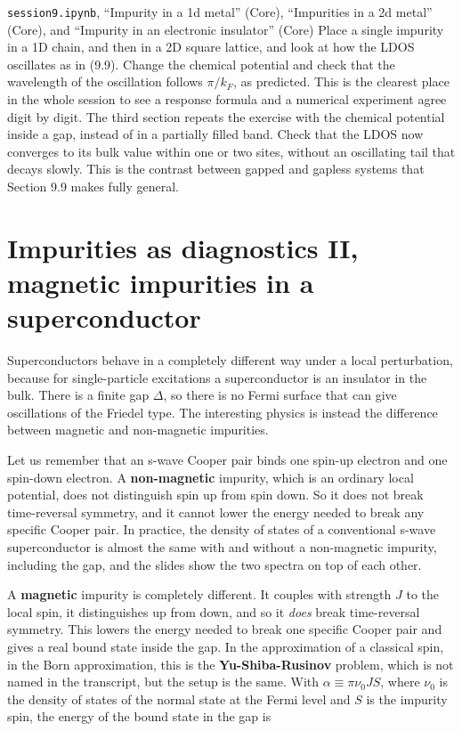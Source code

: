 \begin{notebookbox}{\texttt{session9.ipynb}, ``Impurity in a 1d metal'' (Core), ``Impurities in a 2d metal'' (Core), and ``Impurity in an electronic insulator'' (Core)}
Place a single impurity in a 1D chain, and then in a 2D square lattice, and look at how the LDOS
oscillates as in (9.9). Change the chemical potential and check that the wavelength of the
oscillation follows $\pi/k_F$, as predicted. This is the clearest place in the whole session to see a
response formula and a numerical experiment agree digit by digit. The third section repeats the
exercise with the chemical potential inside a gap, instead of in a partially filled band. Check that
the LDOS now converges to its bulk value within one or two sites, without an oscillating tail that
decays slowly. This is the contrast between gapped and gapless systems that Section 9.9 makes fully
general.
\end{notebookbox}

\section{Impurities as diagnostics II, magnetic impurities in a superconductor}

Superconductors behave in a completely different way under a local perturbation, because for
single-particle excitations a superconductor is an insulator in the bulk. There is a finite gap
$\Delta$, so there is no Fermi surface that can give oscillations of the Friedel type. The interesting
physics is instead the difference between magnetic and non-magnetic impurities.

Let us remember that an s-wave Cooper pair binds one spin-up electron and one spin-down electron. A
\textbf{non-magnetic} impurity, which is an ordinary local potential, does not distinguish spin up from
spin down. So it does not break time-reversal symmetry, and it cannot lower the energy needed to break
any specific Cooper pair. In practice, the density of states of a conventional s-wave superconductor
is almost the same with and without a non-magnetic impurity, including the gap, and the slides show
the two spectra on top of each other.

A \textbf{magnetic} impurity is completely different. It couples with strength $J$ to the local spin,
it distinguishes up from down, and so it \emph{does} break time-reversal symmetry. This lowers the
energy needed to break one specific Cooper pair and gives a real bound state inside the gap. In the
approximation of a classical spin, in the Born approximation, this is the
\textbf{Yu-Shiba-Rusinov} problem, which is not named in the transcript, but the setup is the
same. With $\alpha \equiv \pi
\nu_0 J S$, where $\nu_0$ is the density of states of the normal state at the Fermi level and $S$ is
the impurity spin, the energy of the bound state in the gap is

